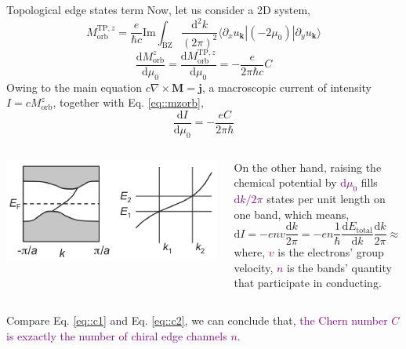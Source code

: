 \documentclass{beamer}
\newcommand{\purple}{\textcolor{purple}}
\begin{document}
    \begin{frame}{Topological edge states term}\scriptsize
      Now, let us consider a 2D system,
      \begin{equation}
        M_{\text{orb}}^{\text{TP},z} = \frac{e}{\hbar{}c}\text{Im}\int_{\text{BZ}}\frac{\mathrm{d}^2k}{(2\pi)^2}\langle\partial_xu_{\bm{k}}|(-2\mu_{0})|\partial_yu_{\bm{k}}\rangle
      \end{equation}
      \begin{equation}
        \label{eq::mzorb}
        \frac{\mathrm{d}M_{\text{orb}}^z}{\mathrm{d}\mu_{0}} = \frac{\mathrm{d}M_{\text{orb}}^{\text{TP},z}}{\mathrm{d}\mu_{0}} = -\frac{e}{2\pi\hbar{}c}C
      \end{equation}
      Owing to the main equation \(c\nabla\times\bm{M} = \bm{j}\), a macroscopic current of intensity \(I = cM_{\text{orb}}^z\), together with Eq. \eqref{eq::mzorb}, 
      \begin{equation}
        \label{eq::c1}
        \frac{\mathrm{d}I}{\mathrm{d}\mu_{0}} = -\frac{eC}{2\pi\hbar}
      \end{equation}
      \begin{columns}
        \begin{column}{0.25\textwidth}
          \includegraphics[width=\textwidth]{figure/Ef-velocity.png}
        \end{column}
        \begin{column}{0.75\textwidth}
          On the other hand, raising the chemical potential by \purple{\(\mathrm{d}\mu_{0}\)} fills \purple{\(\mathrm{d}k/2\pi\)} states per unit length on one band, which means,
      \begin{equation}
        \label{eq::c2}
        \mathrm{d}I = -env\frac{\mathrm{d}k}{2\pi} = -en\frac{1}{\hbar}\frac{\mathrm{d}E_\text{total}}{\mathrm{d}k}\frac{\mathrm{d}k}{2\pi} \approx -\frac{en}{2\pi\hbar}\mathrm{d}\mu_0
      \end{equation}
      where, \purple{\(v\)} is the electrons' group velocity, \purple{\(n\)} is the bands' quantity that participate in conducting.
        \end{column}
      \end{columns}
    
      \begin{block}{}
        Compare Eq. \eqref{eq::c1} and Eq. \eqref{eq::c2}, we can conclude that, \purple{the Chern number \(C\) is exzactly the number of chiral edge channels \(n\).}
      \end{block}
    \end{frame}
\end{document}
